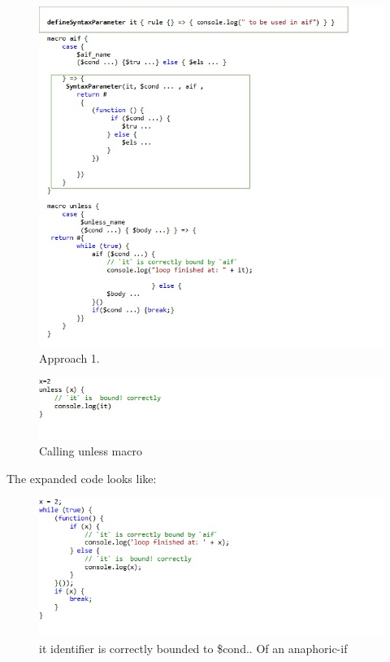 \begin{figure}[htb]
\centering
\includegraphics[width=1.0\textwidth]{images/Appraoch1.jpg}
\caption{Approach 1.} 
\label{fig:AST1}

\end{figure}

\begin{figure}[htb]
\centering
\includegraphics[width=1.0\textwidth]{images/Appraoch2.jpg}
\caption{Calling unless macro} 
\label{fig:AST2}

\end{figure}

The expanded code looks like:

\begin{figure}[htb]
\centering
\includegraphics[width=1.0\textwidth]{images/Appraoch3.jpg}
\caption{ it identifier is correctly bounded to \$cond.. Of an anaphoric-if} 
\label{fig:AST3}

\end{figure}


